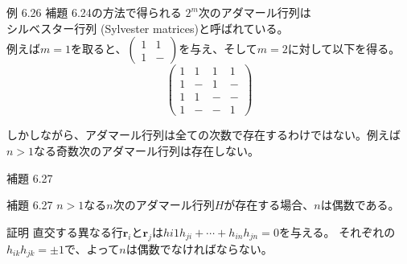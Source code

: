 \documentclass[dvipdfmx,10pt,jsarticle]{beamer}
\begin{document}
  \begin{frame}{例 6.26}
    補題 6.24の方法で得られる $2^m$次のアダマール行列は \\シルベスター行列 (Sylvester matrices)と呼ばれている。\\
    例えば$m = 1$を取ると、$\begin{pmatrix} 1 & 1 \\ 1 & - \end{pmatrix}$を与え、そして$m = 2$に対して以下を得る。
      \[ \begin{pmatrix}
          1 & 1 & 1 & 1 \\
          1 & - & 1 & - \\
          1 & 1 & - & - \\
          1 & - & - & 1
      \end{pmatrix} \]

    しかしながら、アダマール行列は全ての次数で存在するわけではない。例えば$n > 1$なる奇数次のアダマール行列は存在しない。
  \end{frame}

  \begin{frame}{補題 6.27}
    \begin{block}{補題 6.27}
      $n > 1$なる$n$次のアダマール行列$H$が存在する場合、$n$は偶数である。
    \end{block}

      \begin{block}{証明}
        直交する異なる行$\mathbf{r}_i$と$\mathbf{r}_j$は$h{i1}h_{ji} + \cdots + h_{in}h_{jn} = 0$を与える。
        それぞれの$h_{ik}h_{jk} = \pm1$で、よって$n$は偶数でなければならない。
      \end{block}
  \end{frame}
\end{document}
